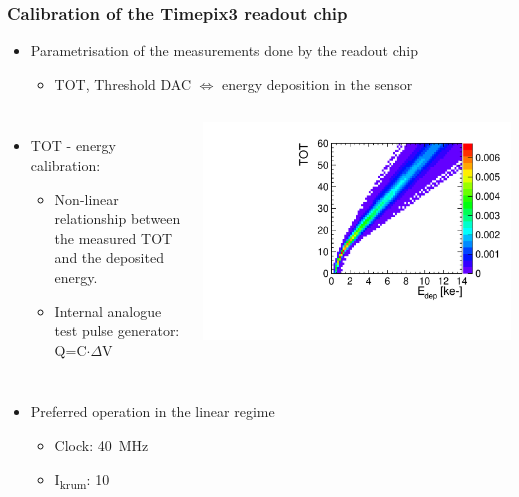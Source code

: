 \begin{frame}
  \frametitle{Calibration of the Timepix3 readout chip}

  \begin{itemize}
  \item Parametrisation of the measurements done by the readout chip
    \begin{itemize}
    \item TOT, Threshold DAC $\Longleftrightarrow$ energy deposition in the sensor
    \end{itemize}
  \end{itemize}

  \begin{columns}
    \begin{itemize}
    \item TOT - energy calibration:
      \begin{itemize}
      \item Non-linear relationship between the measured TOT and the
        deposited energy.
      \item Internal analogue test pulse generator: \\
        Q=C$\cdot \Delta$V
      \end{itemize}
    \end{itemize}

    \centering
    \includegraphics[width=\textwidth]{../figures/Calibration/TOTcalibration_W0005_E02_thresh1160.pdf}
  \end{columns}

  \begin{itemize}
  \item Preferred operation in the linear regime
    \begin{itemize}
    \item Clock: 40~MHz
    \item I\textsubscript{krum}: 10
    \end{itemize}
  \end{itemize}


\end{frame}

